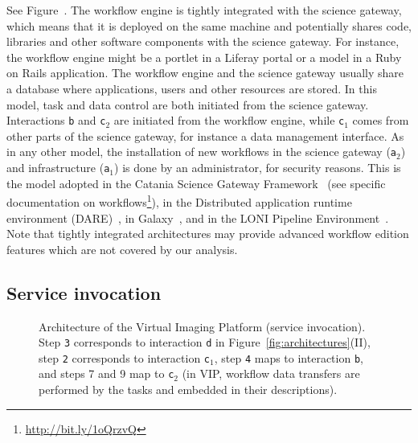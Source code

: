 \documentclass[preprint,3p,twocolumn]{elsarticle}
\begin{document}
See Figure~. The workflow engine is tightly
integrated with the science gateway, which means that it is deployed
on the same machine and potentially shares code, libraries and other
software components with the science gateway. For instance, the
workflow engine might be a portlet in a Liferay portal or a model
in a Ruby on Rails application. The workflow engine and the science
gateway usually share a database where applications, users and other
resources are stored.  In this model, task and
data control are both initiated from the science gateway. Interactions
\texttt{b} and \texttt{c$_2$} are initiated from the workflow engine,
while \texttt{c$_1$} comes from other parts of the science gateway,
for instance a data management interface. As in any other model, the
installation of new workflows in the science gateway (\texttt{a$_2$})
and infrastructure (\texttt{a$_1$}) is done by an administrator, for
security reasons. This is the model adopted in the Catania Science
Gateway Framework~\cite{ardizzone2012decide} (see specific documentation on
workflows\footnote{\url{http://bit.ly/1oQrzvQ}}), in the Distributed
application runtime environment
(DARE)~\cite{maddineni2012distributed}, in
Galaxy~\cite{goecks2010galaxy}, and in the LONI Pipeline
Environment~\cite{dinov2009efficient}. Note that tightly integrated
architectures may provide advanced workflow edition features which are
not covered by our analysis.

\subsection{Service invocation}

\begin{figure}
\centering
\def\svgwidth{1.5\columnwidth}

\caption{Architecture of the Virtual Imaging Platform (service
  invocation).  Step \texttt{3} corresponds to interaction \texttt{d}
  in Figure~\ref{fig:architectures}(II), step \texttt{2} corresponds to
  interaction \texttt{c$_1$}, step \texttt{4} maps to interaction
  \texttt{b}, and steps 7 and 9 map to \texttt{c$_2$} (in VIP, workflow data transfers are
  performed by the tasks and embedded in their descriptions).}
\label{fig:vip-architecture}
\end{figure}
\end{document}
